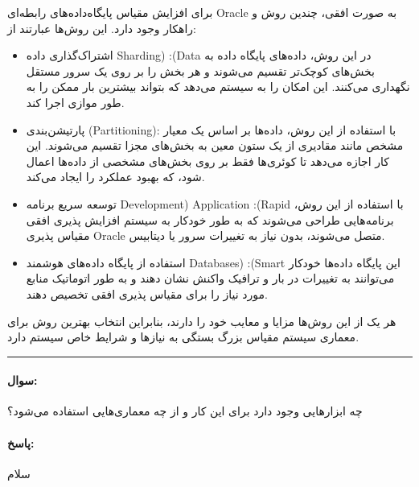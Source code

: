 \documentclass[a4paper,10pt]{article}
\begin{document}
    برای افزایش مقیاس پایگاه‌داده‌های رابطه‌ای Oracle به صورت افقی، چندین روش و راهکار وجود دارد. این روش‌ها عبارتند از:

    \begin{itemize}

        \item اشتراک‌گذاری داده Sharding) :(Data در این روش، داده‌های پایگاه داده به بخش‌های کوچک‌تر تقسیم می‌شوند و هر بخش را بر روی یک سرور مستقل نگهداری می‌کنند. این امکان را به سیستم می‌دهد که بتواند بیشترین بار ممکن را به طور موازی اجرا کند.

        \item پارتیشن‌بندی (Partitioning): با استفاده از این روش، داده‌ها بر اساس یک معیار مشخص مانند مقادیری از یک ستون معین به بخش‌های مجزا تقسیم می‌شوند. این کار اجازه می‌دهد تا کوئری‌ها فقط بر روی بخش‌های مشخصی از داده‌ها اعمال شود، که بهبود عملکرد را ایجاد می‌کند.

        \item توسعه سریع برنامه Development) Application :(Rapid با استفاده از این روش، برنامه‌هایی طراحی می‌شوند که به طور خودکار به سیستم افزایش پذیری افقی مقیاس پذیری Oracle متصل می‌شوند، بدون نیاز به تغییرات سرور یا دیتابیس.

        \item استفاده از پایگاه داده‌های هوشمند Databases) :(Smart این پایگاه داده‌ها خودکار می‌توانند به تغییرات در بار و ترافیک واکنش نشان دهند و به طور اتوماتیک منابع مورد نیاز را برای مقیاس پذیری افقی تخصیص دهند.

    \end{itemize}

    هر یک از این روش‌ها مزایا و معایب خود را دارند، بنابراین انتخاب بهترین روش برای معماری سیستم مقیاس بزرگ بستگی به نیازها و شرایط خاص سیستم دارد.

    \noindent\hrule

    \paragraph{سوال:} چه ابزارهایی وجود دارد برای این کار و از چه معماری‌هایی استفاده می‌شود؟

    \paragraph{پاسخ:} سلام
\end{document}
